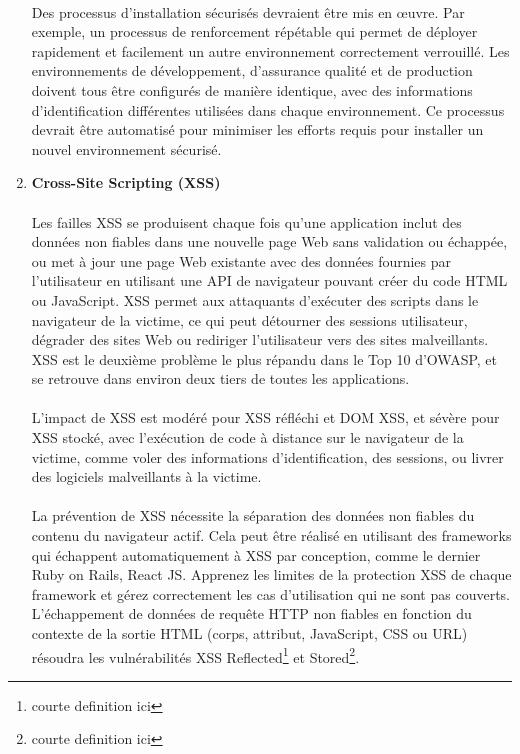 \begin{enumerate}
	\paragraph{}
	Des processus d'installation sécurisés devraient être mis en œuvre. Par exemple, un processus de renforcement répétable qui permet de déployer rapidement et facilement un autre environnement correctement verrouillé. Les environnements de développement, d'assurance qualité et de production doivent tous être configurés de manière identique, avec des informations d'identification différentes utilisées dans chaque environnement. Ce processus devrait être automatisé pour minimiser les efforts requis pour installer un nouvel environnement sécurisé.

	\vspace*{0.8cm} \item \textbf{Cross-Site Scripting (XSS)} \vspace*{-0.4cm}
	\paragraph{}
	Les failles XSS se produisent chaque fois qu'une application inclut des données non fiables dans une nouvelle page Web sans validation ou échappée, ou met à jour une page Web existante avec des données fournies par l'utilisateur en utilisant une API de navigateur pouvant créer du code HTML ou JavaScript. XSS permet aux attaquants d'exécuter des scripts dans le navigateur de la victime, ce qui peut détourner des sessions utilisateur, dégrader des sites Web ou rediriger l'utilisateur vers des sites malveillants.
	XSS est le deuxième problème le plus répandu dans le Top 10 d'OWASP, et se retrouve dans environ deux tiers de toutes les applications.
	\paragraph{}
	L'impact de XSS est modéré pour XSS réfléchi et DOM XSS, et sévère pour XSS stocké, avec l'exécution de code à distance sur le navigateur de la victime, comme voler des informations d'identification, des sessions, ou livrer des logiciels malveillants à la victime.
	\paragraph{}
	La prévention de XSS nécessite la séparation des données non fiables du contenu du navigateur actif. Cela peut être réalisé en utilisant des frameworks qui échappent automatiquement à XSS par conception, comme le dernier Ruby on Rails, React JS. Apprenez les limites de la protection XSS de chaque framework et gérez correctement les cas d'utilisation qui ne sont pas couverts. L'échappement de données de requête HTTP non fiables en fonction du contexte de la sortie HTML (corps, attribut, JavaScript, CSS ou URL) résoudra les vulnérabilités XSS Reflected\footnote{courte definition ici} et Stored\footnote{courte definition ici}.
	

\end{enumerate}
